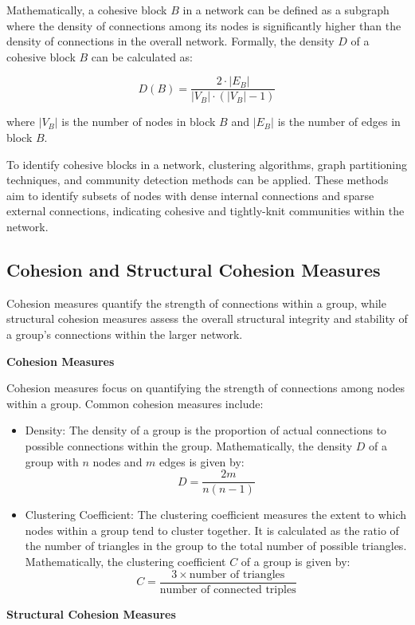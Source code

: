 \documentclass[12pt]{book} %
\begin{document}
Mathematically, a cohesive block \(B\) in a network can be defined as a subgraph where the density of connections among its nodes is significantly higher than the density of connections in the overall network. Formally, the density \(D\) of a cohesive block \(B\) can be calculated as:

\[ D(B) = \frac{2 \cdot |E_B|}{|V_B| \cdot (|V_B| - 1)} \]

where \(|V_B|\) is the number of nodes in block \(B\) and \(|E_B|\) is the number of edges in block \(B\).

To identify cohesive blocks in a network, clustering algorithms, graph partitioning techniques, and community detection methods can be applied. These methods aim to identify subsets of nodes with dense internal connections and sparse external connections, indicating cohesive and tightly-knit communities within the network.

\subsection{Cohesion and Structural Cohesion Measures}

Cohesion measures quantify the strength of connections within a group, while structural cohesion measures assess the overall structural integrity and stability of a group's connections within the larger network.

\textbf{Cohesion Measures}

Cohesion measures focus on quantifying the strength of connections among nodes within a group. Common cohesion measures include:

\begin{itemize}
    \item Density: The density of a group is the proportion of actual connections to possible connections within the group. Mathematically, the density \(D\) of a group with \(n\) nodes and \(m\) edges is given by:
    \[ D = \frac{2m}{n(n-1)} \]
    \item Clustering Coefficient: The clustering coefficient measures the extent to which nodes within a group tend to cluster together. It is calculated as the ratio of the number of triangles in the group to the total number of possible triangles. Mathematically, the clustering coefficient \(C\) of a group is given by:
    \[ C = \frac{3 \times \text{number of triangles}}{\text{number of connected triples}} \]
\end{itemize}

\textbf{Structural Cohesion Measures}
\end{document}
